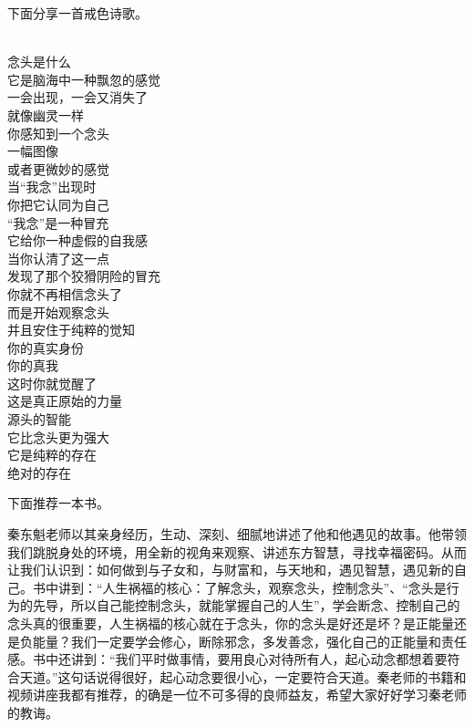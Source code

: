 下面分享一首戒色诗歌。

\begin{poem}[原力觉醒]
    \begin{multicols}{3}
        \begin{center}~\\
            念头是什么 \\ 它是脑海中一种飘忽的感觉 \\ 一会出现，一会又消失了 \\ 就像幽灵一样 \\ 你感知到一个念头 \\ 一幅图像 \\ 或者更微妙的感觉 \\ 当“我念”出现时 \\ 你把它认同为自己 \\ “我念”是一种冒充 \\ 它给你一种虚假的自我感 \\ 当你认清了这一点 \\ 发现了那个狡猾阴险的冒充 \\ 你就不再相信念头了 \\ 而是开始观察念头 \\ 并且安住于纯粹的觉知 \\ 你的真实身份 \\ 你的真我 \\ 这时你就觉醒了 \\ 这是真正原始的力量 \\ 源头的智能 \\ 它比念头更为强大 \\ 它是纯粹的存在 \\ 绝对的存在
        \end{center}
    \end{multicols}
\end{poem}

下面推荐一本书。

\begin{book}
    秦东魁老师以其亲身经历，生动、深刻、细腻地讲述了他和他遇见的故事。他带领我们跳脱身处的环境，用全新的视角来观察、讲述东方智慧，寻找幸福密码。从而让我们认识到：如何做到与子女和，与财富和，与天地和，遇见智慧，遇见新的自己。书中讲到：“人生祸福的核心：了解念头，观察念头，控制念头”、“念头是行为的先导，所以自己能控制念头，就能掌握自己的人生”，学会断念、控制自己的念头真的很重要，人生祸福的核心就在于念头，你的念头是好还是坏？是正能量还是负能量？我们一定要学会修心，断除邪念，多发善念，强化自己的正能量和责任感。书中还讲到：“我们平时做事情，要用良心对待所有人，起心动念都想着要符合天道。”这句话说得很好，起心动念要很小心，一定要符合天道。秦老师的书籍和视频讲座我都有推荐，的确是一位不可多得的良师益友，希望大家好好学习秦老师的教诲。
\end{book}
